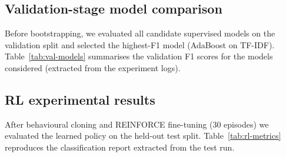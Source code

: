 \documentclass[conference]{IEEEtran}
\begin{document}
\subsection{Validation-stage model comparison}
Before bootstrapping, we evaluated all candidate supervised models on the validation split and selected the highest-F1 model (AdaBoost on TF-IDF). Table~\ref{tab:val-models} summarises the validation F1 scores for the models considered (extracted from the experiment logs).

\begin{table}[h!]
\caption{Validation F1 scores for candidate supervised models (selection stage).}
\label{tab:val-models}
\end{table}

\subsection{RL experimental results}
After behavioural cloning and REINFORCE fine-tuning (30 episodes) we evaluated the learned policy on the held-out test split. Table~\ref{tab:rl-metrics} reproduces the classification report extracted from the test run.

\begin{table}[h!]
\caption{RL policy test metrics (classification report).}
\label{tab:rl-metrics}
\end{table}
\end{document}
